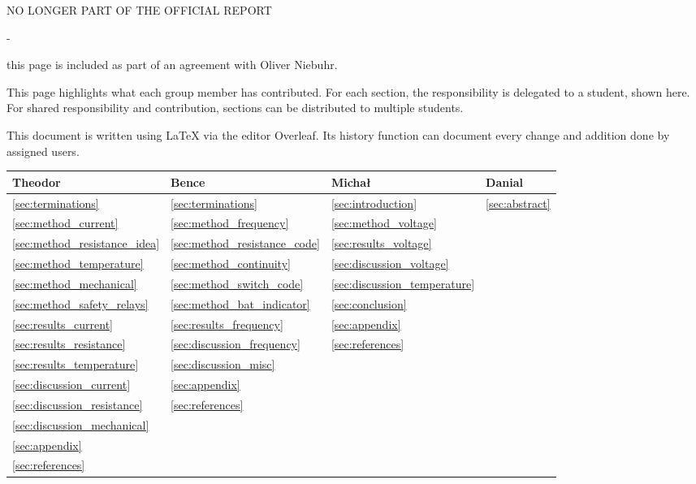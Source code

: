 \clearpage
\fancyhead{}
\begin{center}
NO LONGER PART OF THE OFFICIAL REPORT  

- 

this page is included as part of an agreement with Oliver Niebuhr.
\end{center}

\noindent This page highlights what each group member has contributed. For each section, the responsibility is delegated to a student, shown here. For shared responsibility and contribution, sections can be distributed to multiple students.
\vspace{5mm}

\noindent This document is written using \LaTeX\hspace{0.3mm} via the editor Overleaf. Its history function can document every change and addition done by assigned users.

\renewcommand{\arraystretch}{1.3}
\begin{center}
\begin{tabular}{ | m{2cm} | m{2cm}| m{2cm} | m{2cm} | } 
\hline
 \textbf{Theodor} & \textbf{Bence} & \textbf{Michał} & \textbf{Danial} \\ 
\hline
        \ref{sec:terminations} & \ref{sec:terminations} & \ref{sec:introduction} & \ref{sec:abstract}\\
        \ref{sec:method_current} & \ref{sec:method_frequency} & \ref{sec:method_voltage} & \\
        \ref{sec:method_resistance_idea} & \ref{sec:method_resistance_code} & \ref{sec:results_voltage} & \\
        \ref{sec:method_temperature} & \ref{sec:method_continuity} & \ref{sec:discussion_voltage} & \\
        \ref{sec:method_mechanical} & \ref{sec:method_switch_code} & \ref{sec:discussion_temperature} & \\
        \ref{sec:method_safety_relays} & \ref{sec:method_bat_indicator} & \ref{sec:conclusion} & \\
        \ref{sec:results_current} & \ref{sec:results_frequency} & \ref{sec:appendix} & \\
        \ref{sec:results_resistance} & \ref{sec:discussion_frequency} & \ref{sec:references} & \\
        \ref{sec:results_temperature} & \ref{sec:discussion_misc} &  & \\
        \ref{sec:discussion_current} & \ref{sec:appendix} &  & \\
        \ref{sec:discussion_resistance} & \ref{sec:references} &  & \\
        \ref{sec:discussion_mechanical} & & & \\
        \ref{sec:appendix} &  &  & \\
        \ref{sec:references} &  &  & \\
        \hline
\end{tabular}
\end{center}